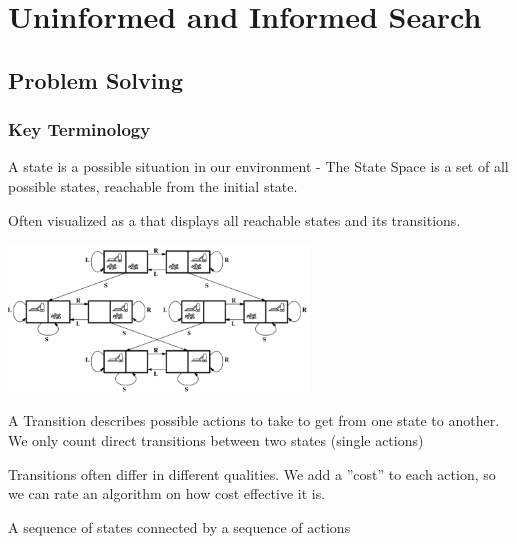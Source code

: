 \documentclass[
../../EiKI_Summary.tex,
]
{subfiles}
\begin{document}
\section{Uninformed and Informed Search}
\subsection{Problem Solving}
\subsubsection{Key Terminology}

\begin{defbox}
    A state is a possible situation in our environment - The State Space is a set of all possible states, reachable from the initial state. 
    
    Often visualized as a  that displays all reachable states and its transitions.

    \begin{center}
        \includegraphics[width=0.6\textwidth]{Pics/3/StateSpaceGraph.png}
    \end{center}
\end{defbox}

\begin{defbox}
    A Transition describes possible actions to take to get from one state to another. We only count direct transitions between two states (single actions)
\end{defbox}

\begin{defbox}
    [Costs]
    Transitions often differ in different qualities. We add a ''cost'' to each action, so we can rate an algorithm on how cost effective it is. 
\end{defbox}

\begin{defbox}
    [Path]
    A sequence of states connected by a sequence of actions
\end{defbox}
\end{document}
